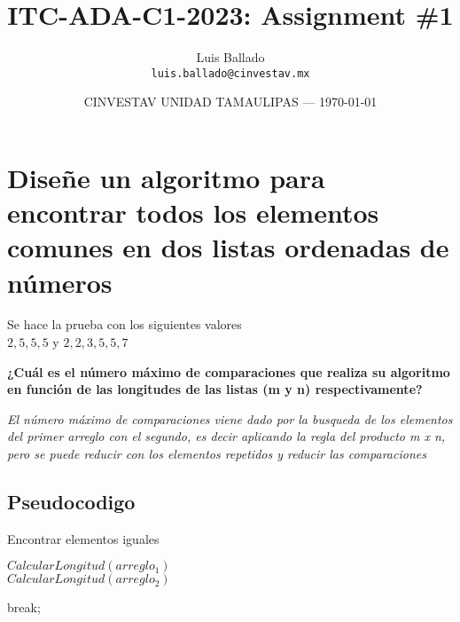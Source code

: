 \documentclass{article}
\title{ITC-ADA-C1-2023: Assignment \#1} %
\author{Luis Ballado\\ \texttt{luis.ballado@cinvestav.mx}} %
\date{CINVESTAV UNIDAD TAMAULIPAS --- \today} %
\begin{document}
\maketitle %


\section{Diseñe un algoritmo para encontrar todos los elementos comunes en dos listas ordenadas de números}

\begin{info} %
  Se hace la prueba con los siguientes valores\\
  $2,5,5,5$ y $2,2,3,5,5,7$
\end{info}

\begin{question}
  \textbf{¿Cuál es el número máximo de comparaciones que realiza su algoritmo en función de las longitudes de las listas (m y n) respectivamente?}

  \textit{El número máximo de comparaciones viene dado por la busqueda de los elementos del primer arreglo con el segundo, es decir aplicando la regla del producto m x n, pero se puede reducir con los elementos repetidos y reducir las comparaciones}
    
\end{question}


\subsection{Pseudocodigo}

\begin{center}
  \begin{minipage}{0.7\linewidth} %
    \begin{algorithm}[H] 
      \DontPrintSemicolon
      
      \caption{Encontrar elementos iguales}
      \label{alg:loop}
            {$CalcularLongitud(arreglo_{1})$}\\
            {$CalcularLongitud(arreglo_{2})$}

             {
               {
                break;\;
              }
            }
    \end{algorithm}
  \end{minipage}
\end{center}
\end{document}
